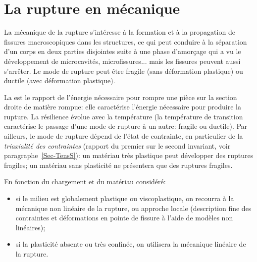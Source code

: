 \chapter{La rupture en mécanique}\label{Ch-rupt}
La mécanique de la rupture s'intéresse à la formation et à la propagation de fissures
macroscopiques dans les structures, ce qui peut conduire à la séparation d'un corps en deux
parties disjointes suite à une phase d'amorçage qui a vu le développement de microcavités,
microfissures... mais les fissures peuvent aussi s'arrêter.
Le mode de rupture peut être fragile (sans déformation plastique) ou ductile (avec déformation
plastique).

\medskip
La  est le rapport de l'énergie nécessaire pour rompre une pièce sur la
section droite de matière rompue: elle caractérise l'énergie nécessaire pour produire la rupture.
La résilience évolue avec la température (la température de transition caractérise le passage
d'une mode de rupture à un autre: fragile ou ductile). Par ailleurs, le mode de rupture dépend de l'état de contrainte, en particulier de la \emph{triaxialité des contraintes} (rapport du premier sur le second invariant, voir paragraphe~\ref{Sec-TensS}): un matériau très plastique peut développer des ruptures fragiles; un matériau sans plasticité ne présentera que des ruptures fragiles.

\medskip
En fonction du chargement et du matériau considéré:
\begin{itemize}
  \item si le milieu est globalement plastique ou viscoplastique, on recourra à la mécanique
	non linéaire de la rupture, ou approche locale (description fine des contraintes et déformations
	en pointe de fissure à l'aide de modèles non linéaires);
  \item si la plasticité absente ou très confinée, on utilisera la mécanique linéaire de la rupture.
\end{itemize}

%
%





\medskip
